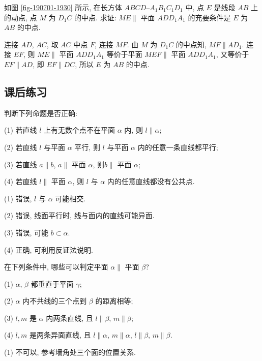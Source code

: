 \begin{exercise}
    如图 \ref{fig-190701-1930} 所示, 在长方体 $ABCD\text{--}A_1 B_1 C_1 D_1$ 中, 点 $E$ 是线段 $AB$ 上的动点, 点 $M$ 为 $D_1C$ 的中点. 求证: $ME\parallel$ 平面 $ADD_1 A_1$ 的充要条件是 $E$ 为 $AB$ 的中点.
\end{exercise}
\beginsolution
    连接 $AD$, $AC$, 取 $AC$ 中点 $F$, 连接 $MF$. 由 $M$ 为 $D_1C$ 的中点知, $MF\parallel AD_1$. 连接 $EF$, 则 $ME\parallel$ 平面 $ADD_1A_1$ 等价于平面 $MEF\parallel$ 平面 $ADD_1A_1$, 又等价于 $EF\parallel AD$, 即 $EF\parallel DC$, 所以 $E$ 为 $AB$ 的中点.
\endsolution

\subsection{课后练习}

\begin{exercise}
    判断下列命题是否正确:
    
    (1) 若直线 $l$ 上有无数个点不在平面 $\alpha$ 内, 则 $l\parallel \alpha$;
    
    (2) 若直线 $l$ 与平面 $\alpha$ 平行, 则 $l$ 与平面 $\alpha$ 内的任意一条直线都平行;
    
    (3) 若直线 $a\parallel b$, $a\parallel$ 平面 $\alpha$, 则$b\parallel$ 平面 $\alpha$;
    
    (4) 若直线 $l\parallel$ 平面 $\alpha$, 则 $l$ 与 $\alpha$ 
    内的任意直线都没有公共点.
\end{exercise}
\beginsolution
    (1) 错误, $l$ 与 $\alpha$ 可能相交.

    (2) 错误, 线面平行时, 线与面内的直线可能异面.

    (3) 错误, 可能 $b\subset\alpha$.

    (4) 正确, 可利用反证法说明.
\endsolution

\begin{exercise}
    在下列条件中, 哪些可以判定平面 $\alpha\parallel$ 平面 $\beta$?
    
    (1) $\alpha$, $\beta$ 都垂直于平面 $\gamma$;
    
    (2) $\alpha$ 内不共线的三个点到 $\beta$ 的距离相等;
    
    (3) $l, m$ 是 $\alpha$ 内两条直线, 且 $l\parallel \beta$, $m\parallel \beta$;
    
    (4) $l, m$ 是两条异面直线, 且 $l\parallel \alpha$, $m\parallel \alpha$, $l\parallel \beta$, $m\parallel \beta$.
\end{exercise}
\beginsolution
    (1) 不可以, 参考墙角处三个面的位置关系.

